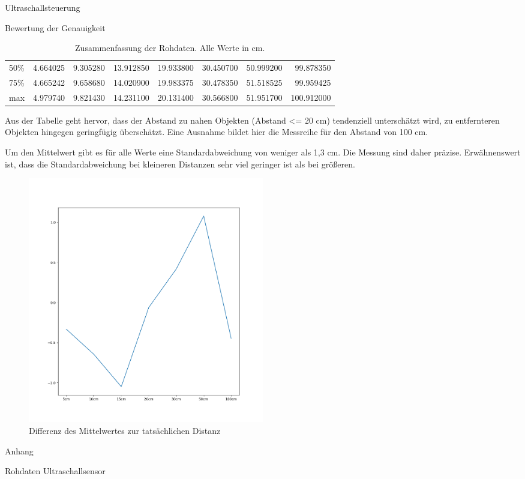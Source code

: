 \documentclass[12pt,twoside]{report}
\begin{document}
\begin{section}{Ultraschallsteuerung}
\begin{subsection}{Bewertung der Genauigkeit}
\begin{table}[h!]
\begin{tabular}{lrrrrrrr}
          50\%   &    4.664025 &    9.305280 &   13.912850 &   19.933800 &   30.450700 &   50.999200 &   99.878350 \\
          75\%   &    4.665242 &    9.658680 &   14.020900 &   19.983375 &   30.478350 &   51.518525 &   99.959425 \\
          max   &    4.979740 &    9.821430 &   14.231100 &   20.131400 &   30.566800 &   51.951700 &  100.912000 \\
        \end{tabular}
        \caption{Zusammenfassung der Rohdaten. Alle Werte in cm.}
    \end{table}
    Aus der Tabelle geht hervor, dass der Abstand zu nahen
    Objekten (Abstand <= 20 cm) tendenziell unterschätzt wird, zu entfernteren
    Objekten hingegen geringfügig überschätzt. Eine Ausnahme bildet hier die
    Messreihe für den Abstand von 100 cm.
    
    Um den Mittelwert gibt es für alle Werte eine Standardabweichung von weniger
    als 1,3 cm. Die Messung sind daher präzise. Erwähnenswert ist, dass die
    Standardabweichung bei kleineren Distanzen sehr viel geringer ist als bei größeren.

    \begin{figure}[h!]
      \centering
      \includegraphics[width=0.5\textwidth]{test_data_ultrasonic/meanDiff.png}
      \caption{Differenz des Mittelwertes zur tatsächlichen Distanz}
    \end{figure}

  \end{subsection}

\end{section}

\begin{section}{Anhang}
  \begin{subsection}{Rohdaten Ultraschallsensor} \label{ultraschallsensorRohdaten}
    
  \end{subsection}
\end{section}
\end{document}
